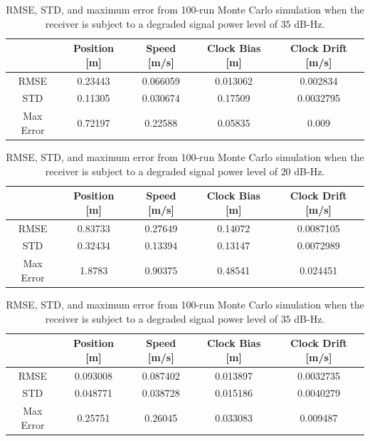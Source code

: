 \begin{table}[!ht]
    \caption{RMSE, STD, and maximum error from 100-run Monte Carlo simulation when the receiver is subject to a degraded signal power level of \(35\) dB-Hz.}\label{tbl:straight35FVDM}
    \centering
    \begin{tabular}{ccccc}
        \toprule
                  & Position [m] & Speed [m/s] & Clock Bias [m] & Clock Drift [m/s] \\
        \midrule
        RMSE      & 0.23443      & 0.066059    & 0.013062       & 0.002834          \\
        STD       & 0.11305      & 0.030674    & 0.17509        & 0.0032795         \\
        Max Error & 0.72197      & 0.22588     & 0.05835        & 0.009             \\
        \bottomrule
    \end{tabular}
\end{table}

\begin{table}[!ht]
    \caption{RMSE, STD, and maximum error from 100-run Monte Carlo simulation when the receiver is subject to a degraded signal power level of \(20\) dB-Hz.}\label{tbl:straight20FVDM}
    \centering
    \begin{tabular}{ccccc}
        \toprule
                  & Position [m] & Speed [m/s] & Clock Bias [m] & Clock Drift [m/s] \\
        \midrule
        RMSE      & 0.83733      & 0.27649     & 0.14072        & 0.0087105         \\
        STD       & 0.32434      & 0.13394     & 0.13147        & 0.0072989         \\
        Max Error & 1.8783       & 0.90375     & 0.48541        & 0.024451          \\
        \bottomrule
    \end{tabular}
\end{table}

\begin{table}[!ht]
    \caption{RMSE, STD, and maximum error from 100-run Monte Carlo simulation when the receiver is subject to a degraded signal power level of \(35\) dB-Hz.}\label{tbl:straight35CV}
    \centering
    \begin{tabular}{ccccc}
        \toprule
                  & Position [m] & Speed [m/s] & Clock Bias [m] & Clock Drift [m/s] \\
        \midrule
        RMSE      & 0.093008     & 0.087402    & 0.013897       & 0.0032735         \\
        STD       & 0.048771     & 0.038728    & 0.015186       & 0.0040279         \\
        Max Error & 0.25751      & 0.26045     & 0.033083       & 0.009487          \\
        \bottomrule
    \end{tabular}
\end{table}


